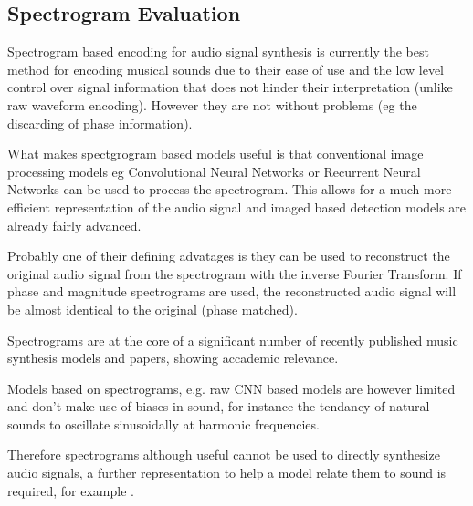 \subsection{Spectrogram Evaluation}

Spectrogram based encoding for audio signal synthesis is currently the best method for encoding musical sounds due to their ease of use and the low level  control over signal information that does not hinder their interpretation (unlike raw waveform encoding). However they are not without problems (eg the discarding of phase information).

What makes spectgrogram based models useful is that conventional image processing models eg Convolutional Neural Networks or Recurrent Neural Networks can be used to process the spectrogram. This allows for a much more efficient representation of the audio signal and imaged based detection models are already fairly advanced.

Probably one of their defining advatages is they can be used to reconstruct the original audio signal from the spectrogram with the inverse Fourier Transform. If phase and magnitude spectrograms are used, the reconstructed audio signal will be almost identical to the original (phase matched).

Spectrograms are at the core of a significant number of recently published music synthesis models and papers, showing accademic relevance.

Models based on spectrograms, e.g. raw CNN based models are however limited and don't make use of biases in sound, for instance the tendancy of natural sounds to oscillate sinusoidally at harmonic frequencies.

Therefore spectrograms although useful cannot be used to directly synthesize audio signals, a further representation to help a model relate them to sound is required, for example .